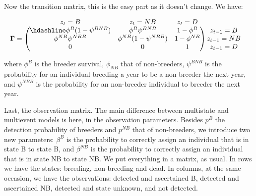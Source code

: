 \documentclass[
  12pt,
]{krantz}
\begin{document}
Now the transition matrix, this is the easy part as it doesn't change. We have:

\[
\begin{matrix}
& \\
\mathbf{\Gamma} =
    \left ( \vphantom{ \begin{matrix} 12 \\ 12 \\ 12 \end{matrix} } \right .
\end{matrix}
\hspace{-1.2em}
\begin{matrix}
    z_t=B & z_t=NB & z_t=D \\ \hdashline
\phi^B (1-\psi^{BNB}) & \phi^B \psi^{BNB} & 1 - \phi^B\\
\phi^{NB} \psi^{NBB} & \phi^{NB} (1-\psi^{NBB}) & 1 - \phi^{NB}\\
0 & 0 & 1
\end{matrix}
\hspace{-0.2em}
\begin{matrix}
& \\
\left . \vphantom{ \begin{matrix} 12 \\ 12 \\ 12 \end{matrix} } \right )
    \begin{matrix}
    z_{t-1}=B \\ z_{t-1}=NB \\ z_{t-1}=D
    \end{matrix}
\end{matrix}
\]

where \(\phi^B\) is the breeder survival, \(\phi_ {NB}\) that of non-breeders, \(\psi^{BNB}\) is the probability for an individual breeding a year to be a non-breeder the next year, and \(\psi^{NBB}\) is the probability for an non-breeder individual to breeder the next year.

Last, the observation matrix. The main difference between multistate and multievent models is here, in the observation parameters. Besides \(p^B\) the detection probability of breeders and \(p^{NB}\) that of non-breeders, we introduce two new parameters: \(\beta^B\) is the probability to correctly assign an individual that is in state B to state B, and \(\beta^{NB}\) is the probability to correctly assign an individual that is in state NB to state NB. We put everything in a matrix, as usual. In rows we have the states: breeding, non-breeding and dead. In columns, at the same occasion, we have the observations: detected and ascertained B, detected and ascertained NB, detected and state unknown, and not detected.
\end{document}
